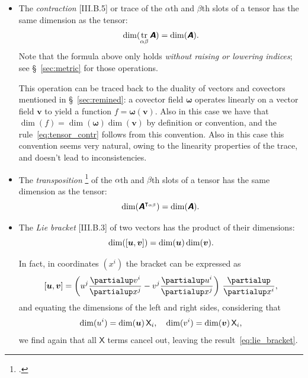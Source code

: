 \documentclass[\ifafour a4paper,12pt,\else a5paper,10pt,\fi%
onecolumn,oneside,article,%
british%
]{memoir}
\theoremstyle{remark}
\theoremstyle{innote}
\newcommand*{\mathte}[1]{\textbf{\textit{\textsf{#1}}}}
\newcommand*{\citep}{\footcites}
\newcommand*{\de}{\partialup}%
\DeclareMathOperator{\tr}{tr}%
\DeclarePairedDelimiter\clcl{[}{]}
\renewcommand*{\|}[1][]{\nonscript\,#1\vert\nonscript\;\mathopen{}}
\newcommand*{\sect}{\S}%
\newcommand*{\Xx}{\textsf{X}}
\newcommand*{\yA}{\mathte{A}}
\newcommand*{\yom}{\bm{\omega}}
\newcommand*{\yv}{\bm{v}}
\newcommand*{\yu}{\bm{u}}
\renewcommand*{\i}{\indices}
\newcommand*{\dex}[1][i]{\frac{\de}{\de x^{#1}}}
\begin{document}
\begin{itemize}[wide=0pt]
\item The \emph{contraction} [III.B.5] or trace of the $\alpha$th and $\beta$th
  slots of a tensor has the same dimension as the tensor:
  \begin{equation}
    \dim(\tr_{\alpha\beta}\yA) = \dim(\yA).
    \label{eq:tensor_contr}
  \end{equation}
  Note that the formula above only holds \emph{without raising or lowering
    indices}; see \sect~\ref{sec:metric} for those operations.

  This operation can be traced back to the duality of vectors and covectors
  mentioned in \sect~\ref{sec:remined}: a covector field $\yom$ operates
  linearly on a vector field $\yv$ to yield a function $f=\yom(\yv)$. Also
  in this case we have that $\dim(f)=\dim(\yom)\dim(\yv)$ by definition or
  convention, and the rule~\eqref{eq:tensor_contr} follows from this
  convention. Also in this case this convention seems very natural, owing
  to the linearity properties of the trace, and doesn't lead to
  inconsistencies.

  

\item The \emph{transposition} \citep[called \enquote{building an isomer}
  by][\sect~I.3 p.~13]{schouten1924_r1954}[\sect~II.4
  p.~20]{schouten1951_r1989} of the $\alpha$th and $\beta$th slots of a
  tensor has the same dimension as the tensor:
  \begin{equation}
    \dim(\yA^{\intercal_{\alpha\beta}}) = \dim(\yA).
    \label{eq:tensor_transp}
  \end{equation}


\item The \emph{Lie bracket} [III.B.3] of two vectors has the product of their dimensions:
  \begin{equation}
    \dim(\clcl{\yu,\yv}) =\dim(\yu)\dim(\yv).
    \label{eq:lie_bracket}
\end{equation}

In fact, in coordinates $(x^{i})$ the bracket can be expressed as
\begin{equation}
  \label{eq:bracket_coords}
  \clcl{\yu,\yv} =
  \biggl( u\i{^{j}}\frac{\de v\i{^{i}}}{\de x\i{^{j}}}
  - v\i{^{j}}\frac{\de u\i{^{i}}}{\de x\i{^{j}}} \biggr)\ \dex,
\end{equation}
and equating the dimensions of the left and right sides, considering that
\begin{equation}
  \label{eq:dim_u_and_v}
  \dim(u\i{^{i}}) = \dim(\yu)\,\Xx_{i},\quad
  \dim(v\i{^{i}}) = \dim(\yv)\,\Xx_{i},
\end{equation}
we find again that all $\Xx$ terms cancel out, leaving the
result~\eqref{eq:lie_bracket}.


\end{itemize}
\end{document}
